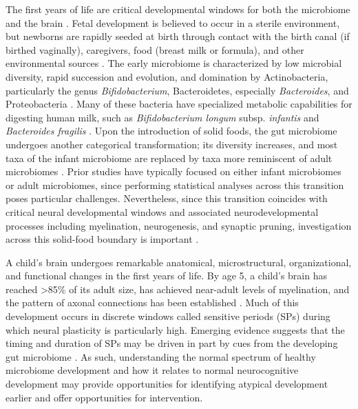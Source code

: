 \documentclass{article}
\begin{document}
The first years of life are critical developmental windows for both the
microbiome and the brain
\cite{laueDevelopingMicrobiomeBirth2022}.
Fetal development is believed to occur in a sterile environment, but newborns
are rapidly seeded at birth through contact with the birth canal (if
birthed vaginally), caregivers, food (breast milk or formula),
and other environmental sources
\cite{backhedDynamicsStabilizationHuman2015,bokulichAntibioticsBirthMode2016}.
The early microbiome is characterized by low microbial
diversity, rapid succession and evolution, and domination by
Actinobacteria, particularly the genus \emph{Bifidobacterium},
Bacteroidetes, especially \emph{Bacteroides}, and Proteobacteria
\cite{koenigSuccessionMicrobialConsortia2011}.
Many of these bacteria have specialized metabolic capabilities
for digesting human milk, such as \emph{Bifidobacterium longum}
subsp. \textit{infantis} and \emph{Bacteroides fragilis}
\cite{selaGenomeSequenceBifidobacterium2008}.
Upon the introduction of solid foods, the gut
microbiome undergoes another categorical transformation;
its diversity increases, and most taxa of the infant microbiome
are replaced by taxa more reminiscent of adult microbiomes
\cite{backhedDynamicsStabilizationHuman2015}.
Prior studies have typically focused on either infant microbiomes or
adult microbiomes, since performing statistical analyses across this
transition poses particular challenges. Nevertheless, since this
transition coincides with critical neural developmental windows and
associated neurodevelopmental processes including myelination, neurogenesis, and synaptic pruning,
investigation across this solid-food boundary is important
\cite{tauNormalDevelopmentBrain2010}.

A child's brain undergoes remarkable anatomical, microstructural,
organizational, and functional changes in the first years of life. By
age 5, a child's brain has reached \textgreater85\% of its adult size,
has achieved near-adult levels of myelination, and the pattern of axonal
connections has been established
\cite{silbereisCellularMolecularLandscapes2016}.
Much of this development occurs in discrete windows called
sensitive periods (SPs)
\cite{knudsenSensitivePeriodsDevelopment2004}
during which neural plasticity is particularly high.
Emerging evidence suggests that the timing and duration of SPs
may be driven in part by cues from the developing gut microbiome
\cite{callaghanNestedSensitivePeriods2020,cowanAnnualResearchReview2020}.
As such, understanding the normal spectrum of healthy microbiome
development and how it relates to normal neurocognitive development may
provide opportunities for identifying atypical development earlier and
offer opportunities for intervention.
\end{document}
